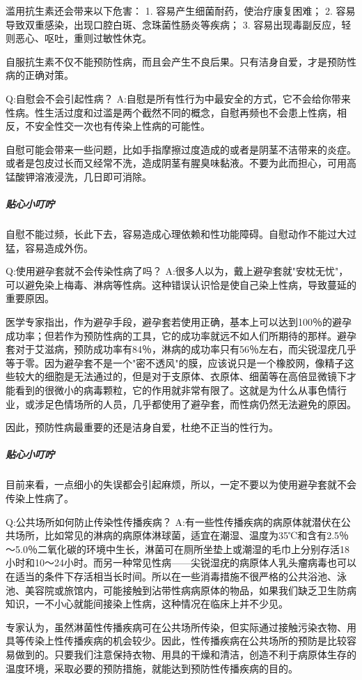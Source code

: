\documentclass[12pt,UTF8]{ctexbook}
\begin{document}
滥用抗生素还会带来以下危害：
1. 容易产生细菌耐药，使治疗康复困难；
2. 容易导致双重感染，出现口腔白斑、念珠菌性肠炎等疾病；
3. 容易出现毒副反应，轻则恶心、呕吐，重则过敏性休克。

自服抗生素不仅不能预防性病，而且会产生不良后果。只有洁身自爱，才是预防性病的正确对策。

Q:自慰会不会引起性病？
A:自慰是所有性行为中最安全的方式，它不会给你带来性病。性生活过度和过滥是两个截然不同的概念，自慰再频也不会患上性病，相反，不安全性交一次也有传染上性病的可能性。

自慰可能会带来一些问题，比如手指摩擦过度造成的或者是阴茎不洁带来的炎症。或者是包皮过长而又经常不洗，造成阴茎有腥臭味黏液。不要为此而担心，可用高锰酸钾溶液浸洗，几日即可消除。

\subparagraph{贴心小叮咛}

自慰不能过频，长此下去，容易造成心理依赖和性功能障碍。自慰动作不能过大过猛，容易造成外伤。

Q:使用避孕套就不会传染性病了吗？
A:很多人以为，戴上避孕套就"安枕无忧"，可以避免染上梅毒、淋病等性病。这种错误认识恰是使自己染上性病，导致蔓延的重要原因。

医学专家指出，作为避孕手段，避孕套若使用正确，基本上可以达到100％的避孕成功率；但若作为预防性病的工具，它的成功率就远不如人们所期待的那样。避孕套对于艾滋病，预防成功率有84％，淋病的成功率只有56％左右，而尖锐湿疣几乎等于零。因为避孕套不是一个"密不透风"的膜，应该说只是一个橡胶网，像精子这些较大的细胞是无法通过的，但是对于支原体、衣原体、细菌等在高倍显微镜下才能看到的很微小的病毒颗粒，它的作用就非常有限了。这就是为什么从事色情行业，或涉足色情场所的人员，几乎都使用了避孕套，而性病仍然无法避免的原因。

因此，预防性病最重要的还是洁身自爱，杜绝不正当的性行为。

\subparagraph{贴心小叮咛}

目前来看，一点细小的失误都会引起麻烦，所以，一定不要以为使用避孕套就不会传染上性病了。

Q:公共场所如何防止传染性传播疾病？
A:有一些性传播疾病的病原体就潜伏在公共场所，比如常见的淋病的病原体淋球菌，适宜在潮湿、温度为35℃和含有2.5％～5.0％二氧化碳的环境中生长，淋菌可在厕所坐垫上或潮湿的毛巾上分别存活18小时和10～24小时。而另一种常见性病——尖锐湿疣的病原体人乳头瘤病毒也可以在适当的条件下存活相当长时间。所以在一些消毒措施不很严格的公共浴池、泳池、美容院或旅馆内，可能接触到沾带性病病原体的物品，如果我们缺乏卫生防病知识，一不小心就能间接染上性病，这种情况在临床上并不少见。

专家认为，虽然淋菌性传播疾病可在公共场所传染，但实际通过接触污染衣物、用具等传染上性传播疾病的机会较少。因此，性传播疾病在公共场所的预防是比较容易做到的。只要我们注意保持衣物、用具的干燥和清洁，创造不利于病原体生存的温度环境，采取必要的预防措施，就能达到预防性传播疾病的目的。
\end{document}
